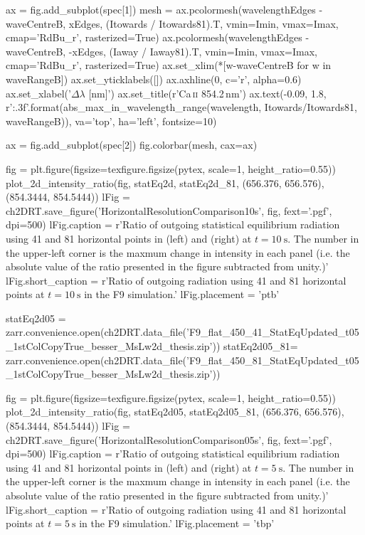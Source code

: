 \begin{pycode}[2DRT]
    ax = fig.add_subplot(spec[1])
    mesh = ax.pcolormesh(wavelengthEdges - waveCentreB, xEdges, (Itowards / Itowards81).T, vmin=Imin, vmax=Imax, cmap='RdBu_r', rasterized=True)
    ax.pcolormesh(wavelengthEdges - waveCentreB, -xEdges, (Iaway / Iaway81).T, vmin=Imin, vmax=Imax, cmap='RdBu_r', rasterized=True)
    ax.set_xlim(*[w-waveCentreB for w in waveRangeB])
    ax.set_yticklabels([])
    ax.axhline(0, c='r', alpha=0.6)
    ax.set_xlabel('$\Delta\lambda$ [nm]')
    ax.set_title(r'Ca\,\textsc{ii} 854.2\,nm')
    ax.text(-0.09, 1.8, r'{:.3f}'.format(abs_max_in_wavelength_range(wavelength,
                                          Itowards/Itowards81, waveRangeB)),
            va='top', ha='left', fontsize=10)

    ax = fig.add_subplot(spec[2])
    fig.colorbar(mesh, cax=ax)

fig = plt.figure(figsize=texfigure.figsize(pytex, scale=1, height_ratio=0.55))
plot_2d_intensity_ratio(fig, statEq2d, statEq2d_81, (656.376, 656.576), (854.3444, 854.5444))
lFig = ch2DRT.save_figure('HorizontalResolutionComparison10s', fig, fext='.pgf', dpi=500)
lFig.caption = r'Ratio of outgoing statistical equilibrium radiation using 41 and 81 horizontal points in \Ha{} (left) and \CaLine{} (right) at $t=\SI{10}{\second}$. The number in the upper-left corner is the maxmum change in intensity in each panel (i.e. the absolute value of the ratio presented in the figure subtracted from unity.)'
lFig.short_caption = r'Ratio of outgoing radiation using 41 and 81 horizontal points at $t=\SI{10}{\second}$ in the F9 simulation.'
lFig.placement = 'ptb'

statEq2d05 = zarr.convenience.open(ch2DRT.data_file('F9_flat_450_41_StatEqUpdated_t05_1stColCopyTrue_besser_MsLw2d_thesis.zip'))
statEq2d05_81= zarr.convenience.open(ch2DRT.data_file('F9_flat_450_81_StatEqUpdated_t05_1stColCopyTrue_besser_MsLw2d_thesis.zip'))

fig = plt.figure(figsize=texfigure.figsize(pytex, scale=1, height_ratio=0.55))
plot_2d_intensity_ratio(fig, statEq2d05, statEq2d05_81, (656.376, 656.576), (854.3444, 854.5444))
lFig = ch2DRT.save_figure('HorizontalResolutionComparison05s', fig, fext='.pgf', dpi=500)
lFig.caption = r'Ratio of outgoing statistical equilibrium radiation using 41 and 81 horizontal points in \Ha{} (left) and \CaLine{} (right) at $t=\SI{5}{\second}$. The number in the upper-left corner is the maxmum change in intensity in each panel (i.e. the absolute value of the ratio presented in the figure subtracted from unity.)'
lFig.short_caption = r'Ratio of outgoing radiation using 41 and 81 horizontal points at $t=\SI{5}{\second}$ in the F9 simulation.'
lFig.placement = 'tbp'



\end{pycode}
